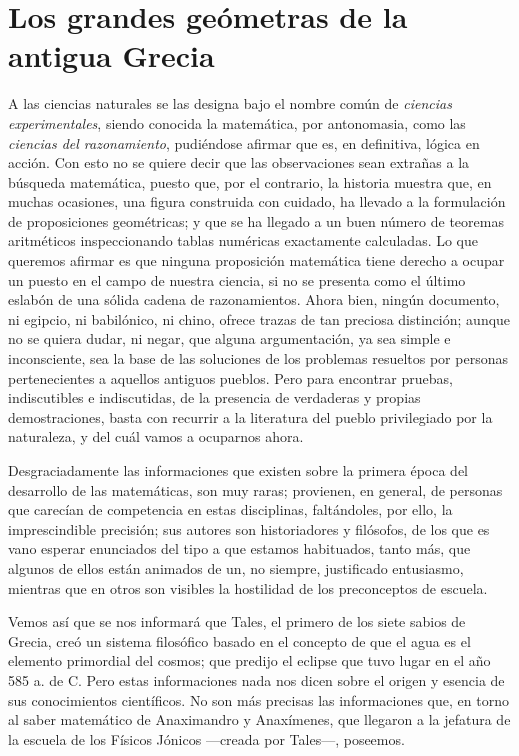 \documentclass[a4paper, 12pt, draft]{article}
\begin{document}
{\newpage

\section*{Los grandes geómetras de la antigua Grecia}



A las ciencias naturales se las designa bajo el nombre común de \textit{ ciencias experimentales}, siendo conocida la matemática, por antonomasia, como las \textit{ ciencias del razonamiento}, pudiéndose afirmar que es, en definitiva, lógica en acción. Con esto no se quiere decir que las observaciones sean extrañas a la búsqueda matemática, puesto que, por el contrario, la historia muestra que, en muchas ocasiones, una figura construida con cuidado, ha llevado a la formulación de proposiciones geométricas; y que se ha llegado a un buen número de teoremas aritméticos inspeccionando tablas numéricas exactamente calculadas. Lo que queremos afirmar es que ninguna proposición matemática tiene derecho a ocupar un puesto en el campo de nuestra ciencia, si no se presenta como el último eslabón de una sólida cadena de razonamientos. Ahora bien, ningún documento, ni egipcio, ni babilónico, ni chino, ofrece trazas de tan preciosa distinción; aunque no se quiera dudar, ni negar, que alguna argumentación, ya sea simple e inconsciente, sea la base de las soluciones de los problemas resueltos por personas pertenecientes a aquellos antiguos pueblos. Pero
para encontrar pruebas, indiscutibles e indiscutidas, 
de la presencia de verdaderas y propias demostraciones, basta con recurrir a la literatura del pueblo privilegiado por la naturaleza, y del cuál vamos a ocuparnos ahora.


Desgraciadamente las informaciones que existen sobre la primera época del desarrollo de las matemáticas, son muy raras; provienen, en general, de personas que carecían de competencia 
en estas disciplinas, faltándoles, por ello, la imprescindible precisión; sus autores son historiadores y filósofos, de los que es vano esperar enunciados del tipo a que estamos habituados, tanto más, que algunos de ellos están animados de un, no siempre, justificado entusiasmo, mientras que en otros son visibles la hostilidad de los preconceptos de escuela.

Vemos así que se nos informará que Tales, el primero de los siete sabios de Grecia, creó un sistema filosófico basado en el concepto de que el agua es el elemento primordial del cosmos; que predijo el eclipse que tuvo lugar en el año 585 a. de C. Pero estas informaciones nada nos dicen sobre el origen y esencia de sus conocimientos científicos. No son más precisas las informaciones que, en torno al saber matemático de Anaximandro y Anaxímenes, que
llegaron a la jefatura de la escuela de los Físicos
Jónicos ---creada por Tales---, poseemos.

}
\end{document}
